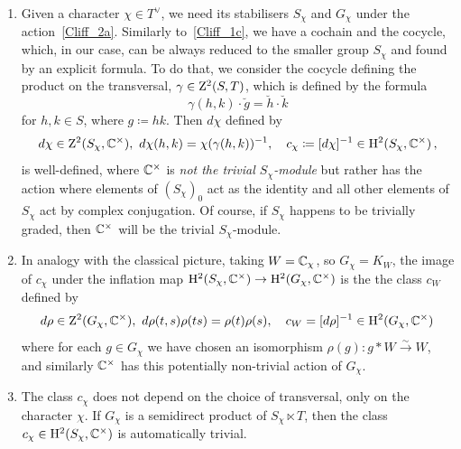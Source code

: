 \begin{enumerate}[resume, label=\textnormal{(\Roman*)}]
\item Given a character $\chi\in T^\vee$, we need its stabilisers $S_\chi$ and $G_\chi$ under the action~\eqref{Cliff_2a}.
Similarly to~\eqref{Cliff_1c}, we have a cochain and the cocycle, which, in our case, can be always reduced to the smaller group $S_\chi$ and found by an explicit formula. To do that, we consider the cocycle defining the product on the transversal, $\gamma \in \mathrm{Z}^2 (S, T)$, which is defined by the formula
\begin{equation} \label{Cliff_2c_0}
\gamma (h,k) \cdot \breve{g}  = \breve{h} \cdot \breve{k}
\end{equation}
for $h,k\in S$, where $g \coloneqq hk$. Then $d\chi$ defined by
\begin{equation} \label{Cliff_2c}
d\chi \in \mathrm{Z}^2 (S_\chi , {\mathbb C}^\times), \  
d \chi (h,k) = \chi (\gamma (h,k))^{-1}, \quad
c_\chi \coloneqq [ d \chi]^{-1} \in \mathrm{H}^2 (S_\chi , {\mathbb C}^\times)\, ,
\end{equation}  
is well-defined, where ${\mathbb C}^{\times}$ is \emph{not the trivial $S_{\chi}$-module} but rather has the action where elements of $(S_{\chi})_0$ act as the identity and all other elements of $S_{\chi}$ act by complex conjugation. Of course, if $S_{\chi}$ happens to be trivially graded, then ${\mathbb C}^{\times}$ will be the trivial $S_{\chi}$-module.
\item In analogy with the classical picture, taking $W = {\mathbb C}_{\chi}$, so $G_{\chi} = K_W$, the image of $c_\chi$ under the inflation map $\mathrm{H}^2(S_\chi, {\mathbb C}^{\times}) \rightarrow \mathrm{H}^2(G_{\chi}, {\mathbb C}^{\times})$ is the the class $c_W$ defined by
\begin{equation}\label{Cliff_1c_new}
d\rho \in \mathrm{Z}^2 (G_{\chi} , {\mathbb C}^\times), \ d \rho (t,s) \rho (ts) = \rho (t) \rho (s), \quad
c_W = [ d \rho]^{-1} \in \mathrm{H}^2 (G_{\chi} , {\mathbb C}^\times) \, 
\end{equation}  
where for each $g \in G_{\chi}$ we have chosen an isomorphism $\rho(g) \colon g * W \xrightarrow{\sim} W$, and similarly ${\mathbb C}^{\times}$ has this potentially non-trivial action of $G_{\chi}$.
\item The class $c_\chi$ does not depend on the choice of transversal, only on the character $\chi$.
  If $G_\chi$ is a semidirect product of $S_\chi \ltimes T$,
    then the class $c_\chi \in \mathrm{H}^2 (S_\chi , {\mathbb C}^\times)$ is automatically trivial. 
\end{enumerate}

